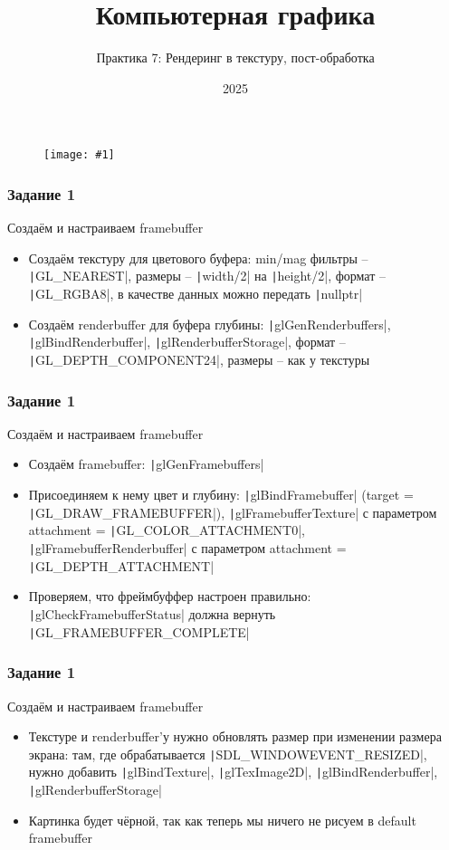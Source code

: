 \documentclass[10pt]{beamer}
\title{Компьютерная графика}
\subtitle{Практика 7: Рендеринг в текстуру, пост-обработка}
\date{2025}
\newcommand{\slideimage}[1]{
  \begin{figure}
    \begin{adjustbox}{width=\textwidth, totalheight=\textheight-2\baselineskip-2\baselineskip,keepaspectratio}
      \texttt{[image: \#1]}
    \end{adjustbox}
  \end{figure}
}
\begin{document}
\frame{\titlepage}

\begin{frame}[fragile]
\slideimage{0.png}
\end{frame}


\begin{frame}[fragile]
\frametitle{Задание 1}
Создаём и настраиваем framebuffer
\begin{itemize}
\item Создаём текстуру для цветового буфера: min/mag фильтры -- \texttt|GL_NEAREST|, размеры -- \texttt|width/2| на \texttt|height/2|, формат -- \texttt|GL_RGBA8|, в качестве данных можно передать \texttt|nullptr|
\item Создаём renderbuffer для буфера глубины: \texttt|glGenRenderbuffers|, \texttt|glBindRenderbuffer|, \texttt|glRenderbufferStorage|, формат -- \texttt|GL_DEPTH_COMPONENT24|, размеры -- как у текстуры
\end{itemize}
\end{frame}

\begin{frame}[fragile]
\frametitle{Задание 1}
Создаём и настраиваем framebuffer
\begin{itemize}
\item Создаём framebuffer: \texttt|glGenFramebuffers|
\item Присоединяем к нему цвет и глубину: \texttt|glBindFramebuffer| (target = \texttt|GL_DRAW_FRAMEBUFFER|), \texttt|glFramebufferTexture| с параметром attachment = \texttt|GL_COLOR_ATTACHMENT0|, \texttt|glFramebufferRenderbuffer| с параметром attachment = \texttt|GL_DEPTH_ATTACHMENT|
\item Проверяем, что фреймбуффер настроен правильно: \texttt|glCheckFramebufferStatus| должна вернуть \texttt|GL_FRAMEBUFFER_COMPLETE|
\end{itemize}
\end{frame}

\begin{frame}[fragile]
\frametitle{Задание 1}
Создаём и настраиваем framebuffer
\begin{itemize}
\item Текстуре и renderbuffer'у нужно обновлять размер при изменении размера экрана: там, где обрабатывается \texttt|SDL_WINDOWEVENT_RESIZED|, нужно добавить \texttt|glBindTexture|, \texttt|glTexImage2D|, \texttt|glBindRenderbuffer|, \texttt|glRenderbufferStorage|
\item Картинка будет чёрной, так как теперь мы ничего не рисуем в default framebuffer
\end{itemize}
\end{frame}
\end{document}
